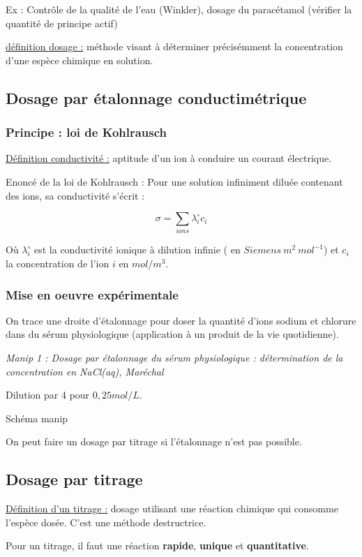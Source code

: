 \documentclass{article}%
\begin{document}
Ex : Contrôle de la qualité de l'eau (Winkler), dosage du paracétamol (vérifier la quantité de principe actif)

\underline{définition dosage :} méthode visant à déterminer précisémment la concentration d'une espèce chimique en solution.

\subsection{Dosage par étalonnage conductimétrique}
\subsubsection{Principe : loi de Kohlrausch}

\underline{Définition conductivité :} aptitude d'un ion à conduire un courant électrique.

Enoncé de la loi de Kohlrausch :
Pour une solution infiniment diluée contenant des ions, sa conductivité s'écrit :

\[\sigma = \sum_{ions} \lambda_i^\circ c_i\]

Où $\lambda_i^\circ$ est la conductivité ionique à dilution infinie ( en $Siemens~m^2~mol^{-1}$) et $c_i$ la concentration de l'ion $i$ en $mol/m^3$.
\subsubsection{Mise en oeuvre expérimentale}

On trace une droite d'étalonnage pour doser la quantité d'ions sodium et chlorure dans du sérum physiologique (application à un produit de la vie quotidienne). 

\textit{Manip 1 : Dosage par étalonnage du sérum physiologique : détermination de la concentration en NaCl(aq), Maréchal}

Dilution par 4 pour $0,25 mol/L$.

Schéma manip

On peut faire un dosage par titrage si l'étalonnage n'est pas possible.

\subsection{Dosage par titrage}

\underline{Définition d'un titrage :} dosage utilisant une réaction chimique qui consomme l'espèce dosée. C'est une méthode destructrice.

Pour un titrage, il faut une réaction \textbf{rapide}, \textbf{unique} et \textbf{quantitative}.
\end{document}
